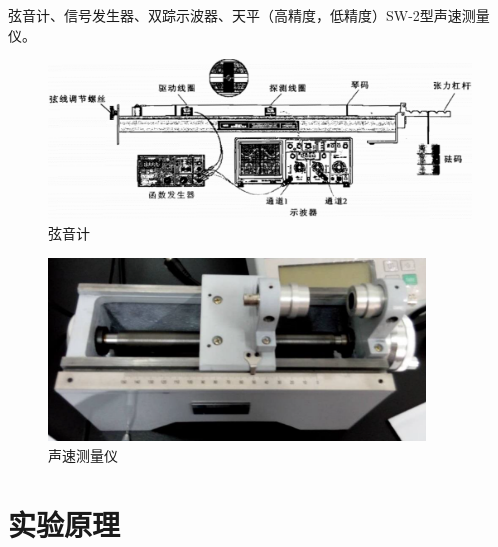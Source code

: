 \documentclass[11pt]{article}
\begin{document}
    \hspace*{2em} 弦音计、信号发生器、双踪示波器、天平（高精度，低精度）SW-2型声速测量仪。
\begin{figure}[H]
    \centering
    \includegraphics[width=12cm]{Fig/1.png}
    \caption{弦音计}
\end{figure}
\begin{figure}[H]
    \centering
    \includegraphics[width=10cm]{Fig/1.5.png}
    \caption{声速测量仪}
\end{figure}
\section{实验原理}
\end{document}
